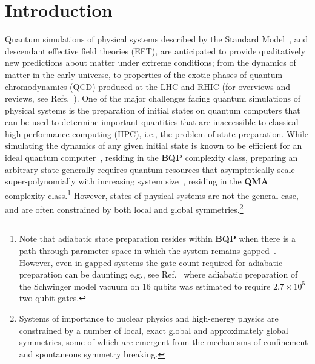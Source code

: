 \documentclass[aps, pra, onecolumn, tightenlines, letterpaper, amsmath, amssymb, preprintnumbers, floatfix, longbibliography, nofootinbib]{revtex4-2}
\begin{document}
\maketitle
\newpage{}

\begingroup
\hypersetup{linkcolor=black}
\tableofcontents
\endgroup


\newpage{}
\section{Introduction}
\setcounter{page}{1}
\label{sec:I}
\noindent
Quantum simulations of physical systems described by the Standard Model~\cite{Weinberg:1967tq,Glashow:1961tr,Salam:1968rm,Politzer:1973fx,Gross:1973id,Higgs:1964pj}, 
and descendant effective field theories (EFT),
are anticipated to provide qualitatively new predictions about matter under extreme conditions; from the dynamics of matter in the early universe, 
to properties of the exotic phases of quantum chromodynamics (QCD) produced at the LHC and RHIC (for overviews and reviews, see Refs.~\cite{Banuls:2019bmf,Guan:2020bdl,Klco:2021lap,Delgado:2022tpc,Bauer:2022hpo,Humble:2022klb,Beck:2023xhh,Bauer:2023qgm,DiMeglio:2023nsa}).
One of the major challenges facing quantum simulations of physical systems is 
the preparation of initial states on quantum computers
that can be used to determine important quantities that are inaccessible to  
classical high-performance computing (HPC),
i.e., the problem of state preparation.
While simulating the dynamics of any given initial state 
is known to be efficient for an ideal quantum computer~\cite{Lloyd1073},
residing in the {\bf BQP} complexity class,
preparing an arbitrary state generally requires 
quantum resources that asymptotically scale 
super-polynomially  with increasing system size~\cite{10.1007/978-3-540-30538-5_31},
residing in the {\bf QMA} complexity class.\footnote{Note that adiabatic state preparation resides within {\bf BQP} when there is a path through parameter space in which the system remains gapped~\cite{farhi2000quantum,van_Dam_2001}.
However, even in gapped systems the gate count required for adiabatic preparation can be daunting; e.g., see Ref.~\cite{Chakraborty:2020uhf} where adiabatic preparation of the Schwinger model vacuum on 16 qubits was estimated to require $2.7\times10^5$ two-qubit gates.}
However, states of physical systems are not the general case, and are often constrained by both local and global symmetries.\footnote{Systems of importance to nuclear physics and high-energy physics are constrained by
a number of local, exact global and approximately global symmetries, 
some of which are emergent from the mechanisms of confinement 
and spontaneous symmetry breaking.} 
\end{document}

